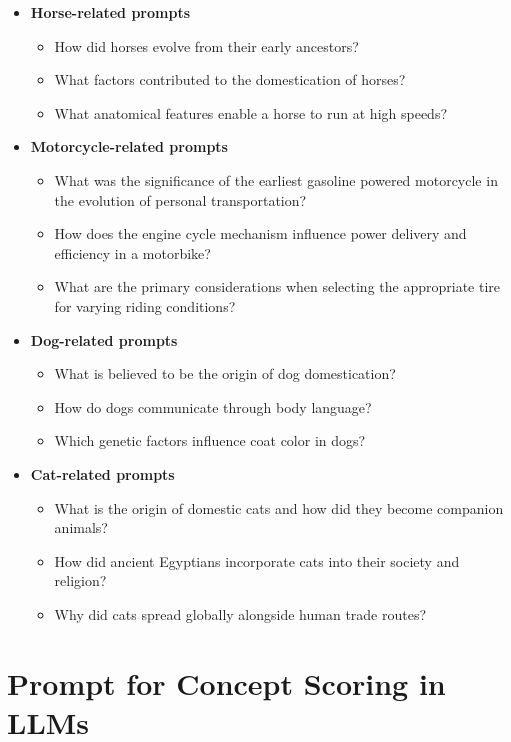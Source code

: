 \begin{itemize}
  \item \textbf{Horse-related prompts}
  \begin{itemize}
    \item How did horses evolve from their early ancestors?
    \item What factors contributed to the domestication of horses?
    \item What anatomical features enable a horse to run at high speeds?
  \end{itemize}

  \item \textbf{Motorcycle-related prompts}
  \begin{itemize}
    \item What was the significance of the earliest gasoline powered motorcycle in the evolution of personal transportation?
    \item How does the engine cycle mechanism influence power delivery and efficiency in a motorbike?
    \item What are the primary considerations when selecting the appropriate tire for varying riding conditions?
  \end{itemize}

  \item \textbf{Dog-related prompts}
  \begin{itemize}
    \item What is believed to be the origin of dog domestication?
    \item How do dogs communicate through body language?
    \item Which genetic factors influence coat color in dogs?
  \end{itemize}

  \item \textbf{Cat-related prompts}
  \begin{itemize}
    \item What is the origin of domestic cats and how did they become companion animals?
    \item How did ancient Egyptians incorporate cats into their society and religion?
    \item Why did cats spread globally alongside human trade routes?
  \end{itemize}
\end{itemize}


\section{Prompt for Concept Scoring in LLMs}
\label{sec:judge_prompt}

